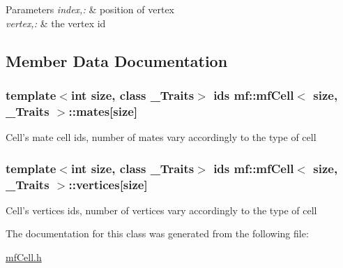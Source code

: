 \begin{DoxyParams}{Parameters}
{\em index,:} & position of vertex \\
\hline
{\em vertex,:} & the vertex id \\
\hline
\end{DoxyParams}


\subsection{Member Data Documentation}
\hypertarget{classmf_1_1mfCell_a4bc12b8877d6ade93549032c569bb40f}{
\subsubsection[{mates}]{\setlength{\rightskip}{0pt plus 5cm}template$<$int size, class \_\-Traits$>$ {\bf ids} {\bf mf::mfCell}$<$ size, \_\-Traits $>$::{\bf mates}\mbox{[}size\mbox{]}}}
\label{classmf_1_1mfCell_a4bc12b8877d6ade93549032c569bb40f}
Cell's mate cell ids, number of mates vary accordingly to the type of cell \hypertarget{classmf_1_1mfCell_a4d540b27089268665e1800cb7bf6b04d}{
\subsubsection[{vertices}]{\setlength{\rightskip}{0pt plus 5cm}template$<$int size, class \_\-Traits$>$ {\bf ids} {\bf mf::mfCell}$<$ size, \_\-Traits $>$::{\bf vertices}\mbox{[}size\mbox{]}}}
\label{classmf_1_1mfCell_a4d540b27089268665e1800cb7bf6b04d}
Cell's vertices ids, number of vertices vary accordingly to the type of cell 

The documentation for this class was generated from the following file:\begin{DoxyCompactItemize}
\item 
\hyperlink{mfCell_8h}{mfCell.h}\end{DoxyCompactItemize}
